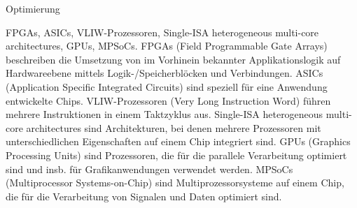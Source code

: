 \documentclass{article}
\begin{document}
\begin{exercise}{Optimierung}
\begin{enumerate}
          \begin{solution}
            FPGAs, ASICs, VLIW-Prozessoren, Single-ISA heterogeneous multi-core architectures, GPUs, MPSoCs.
            FPGAs (Field Programmable Gate Arrays) beschreiben die Umsetzung von im Vorhinein bekannter Applikationslogik auf Hardwareebene mittels Logik-/Speicherblöcken und Verbindungen.
            ASICs (Application Specific Integrated Circuits) sind speziell für eine Anwendung entwickelte Chips.
            VLIW-Prozessoren (Very Long Instruction Word) führen mehrere Instruktionen in einem Taktzyklus aus.
            Single-ISA heterogeneous multi-core architectures sind Architekturen, bei denen mehrere Prozessoren mit unterschiedlichen Eigenschaften auf einem Chip integriert sind.
            GPUs (Graphics Processing Units) sind Prozessoren, die für die parallele Verarbeitung optimiert sind und insb. für Grafikanwendungen verwendet werden.
            MPSoCs (Multiprocessor Systems-on-Chip) sind Multiprozessorsysteme auf einem Chip, die für die Verarbeitung von Signalen und Daten optimiert sind.
          \end{solution}
  \end{enumerate}
\end{exercise}
\end{document}
